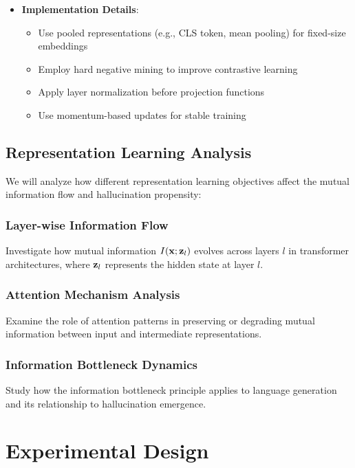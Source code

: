 \begin{itemize}
    \item \textbf{Implementation Details}:
    \begin{itemize}
        \item Use pooled representations (e.g., CLS token, mean pooling) for fixed-size embeddings
        \item Employ hard negative mining to improve contrastive learning
        \item Apply layer normalization before projection functions
        \item Use momentum-based updates for stable training
    \end{itemize}
\end{itemize}

\subsection{Representation Learning Analysis}
\label{subsec:repr_analysis}

We will analyze how different representation learning objectives affect the mutual information flow and hallucination propensity:

\subsubsection{Layer-wise Information Flow}
Investigate how mutual information $I({\mathbf{x}}; {\mathbf{z}}_l)$ evolves across layers $l$ in transformer architectures, where ${\mathbf{z}}_l$ represents the hidden state at layer $l$.

\subsubsection{Attention Mechanism Analysis}
Examine the role of attention patterns in preserving or degrading mutual information between input and intermediate representations.

\subsubsection{Information Bottleneck Dynamics}
Study how the information bottleneck principle applies to language generation and its relationship to hallucination emergence.

\section{Experimental Design}
\label{sec:experiments}

